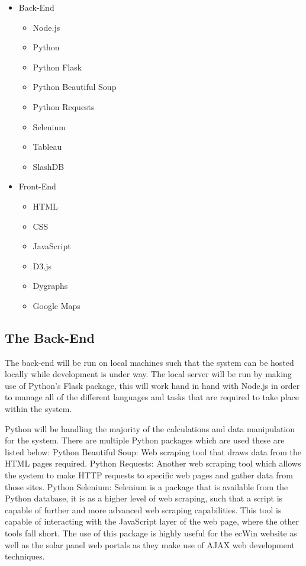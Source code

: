 \documentclass[12pt,onecolumn]{IEEEtran}
\begin{document}
\begin{itemize}
    \item Back-End
    \begin{itemize}
        \item Node.js
        \item Python
        \item Python Flask
        \item Python Beautiful Soup
        \item Python Requests
        \item Selenium
        \item Tableau
        \item SlashDB
    \end{itemize}
    \item Front-End
    \begin{itemize}
        \item HTML
        \item CSS
        \item JavaScript
        \item D3.js
        \item Dygraphs
        \item Google Maps
    \end{itemize}
\end{itemize}

\subsection{The Back-End}
The back-end will be run on local machines such that the system can be hosted locally while development is under way. 
The local server will be run by making use of Python's Flask package, this will work hand in hand with Node.js in order to manage all of the different languages and tasks that are required to take place within the system. 

Python will be handling the majority of the calculations and data manipulation for the system. There are multiple Python packages which are used these are listed below:
Python Beautiful Soup: Web scraping tool that draws data from the HTML pages required.
Python Requests: Another web scraping tool which allows the system to make HTTP requests to specific web pages and gather data from those sites. 
Python Selenium: Selenium is a package that is available from the Python database, it is as a higher level of web scraping, such that a script is capable of further and more advanced web scraping capabilities. This tool is capable of interacting with the JavaScript layer of the web page, where the other tools fall short. The use of this package is highly useful for the ecWin website as well as the solar panel web portals as they make use of AJAX web development techniques.
\end{document}
